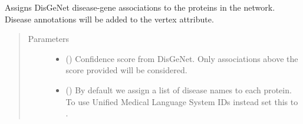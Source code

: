 \documentclass[letterpaper,10pt,english]{sphinxmanual}
\begin{document}
\begin{fulllineitems}
\begin{fulllineitems}
\end{fulllineitems}


\begin{fulllineitems}
\label{\detokenize{reference:pypath.main.PyPath.load_ddis}}
\end{fulllineitems}


\begin{fulllineitems}
\label{\detokenize{reference:pypath.main.PyPath.load_depod_dmi}}
\end{fulllineitems}


\begin{fulllineitems}
\label{\detokenize{reference:pypath.main.PyPath.load_disgenet}}
Assigns DisGeNet disease-gene associations to the proteins
in the network. Disease annotations will be added to the 
vertex attribute.
\begin{quote}\begin{description}
\item[{Parameters}] \leavevmode\begin{itemize}
\item {} 
 () \textendash{} Confidence score from DisGeNet. Only associations
above the score provided will be considered.

\item {} 
 () \textendash{} By default we assign a list of disease names to
each protein. To use Unified Medical Language System IDs instead
set this to .


\end{itemize}
\end{description}
\end{quote}
\end{fulllineitems}
\end{fulllineitems}
\end{document}
